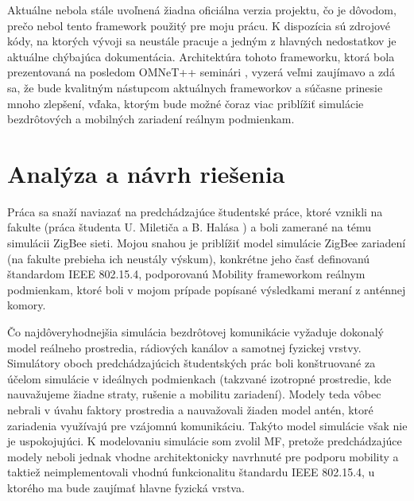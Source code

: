 \documentclass[11pt,twoside,a4paper]{book}
\begin{document}
Aktuálne nebola stále uvoľnená žiadna oficiálna verzia projektu, čo je dôvodom, prečo nebol tento framework použitý pre moju prácu. K dispozícia sú zdrojové kódy, na ktorých vývoji sa neustále pracuje a jedným z hlavných nedostatkov je aktuálne chýbajúca dokumentácia. Architektúra \cite{MIXIMArch} tohoto frameworku, ktorá bola prezentovaná na posledom OMNeT++ seminári \cite{omnetWorkshop}, vyzerá veľmi zaujímavo a zdá sa, že bude kvalitným nástupcom aktuálnych frameworkov a súčasne prinesie mnoho zlepšení, vďaka, ktorým bude možné čoraz viac priblížiť simulácie bezdrôtových a mobilných zariadení reálnym podmienkam.





\chapter{Analýza a návrh riešenia}

Práca sa snaží naviazať na predchádzajúce študentské práce, ktoré vznikli na fakulte (práca študenta U. Miletiča \cite{miletic} a B. Halása \cite{halas}) a boli zamerané na tému simulácii ZigBee sieti. Mojou snahou je priblížiť model simulácie ZigBee zariadení (na fakulte prebieha ich neustály výskum), konkrétne jeho časť definovanú štandardom IEEE 802.15.4, podporovanú Mobility frameworkom reálnym podmienkam, ktoré boli v mojom prípade popísané výsledkami meraní z anténnej komory.

Čo najdôveryhodnejšia simulácia bezdrôtovej komunikácie vyžaduje dokonalý model reálneho prostredia, rádiových kanálov a samotnej fyzickej vrstvy. Simulátory oboch predchádzajúcich študentských prác boli konštruované za účelom simulácie v ideálnych podmienkach (takzvané izotropné prostredie, kde nauvažujeme žiadne straty, rušenie a mobilitu zariadení). Modely teda vôbec nebrali v úvahu faktory prostredia a nauvažovali žiaden model antén, ktoré zariadenia využívajú pre vzájomnú komunikáciu. Takýto model simulácie však nie je uspokojujúci. K modelovaniu simulácie som zvolil MF, pretože predchádzajúce modely neboli jednak vhodne architektonicky navrhnuté pre podporu mobility a taktiež neimplementovali vhodnú funkcionalitu štandardu IEEE 802.15.4, u ktorého ma bude zaujímať hlavne fyzická vrstva.
\end{document}
